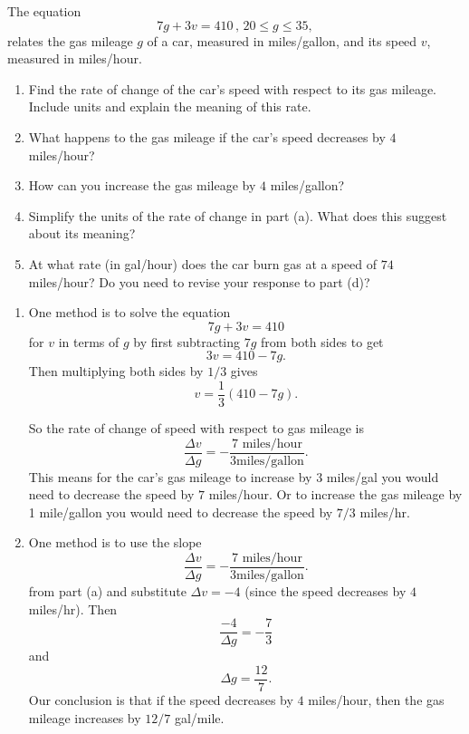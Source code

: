 \documentclass{ximera}
\begin{document}
\begin{question}  \label{Q43rtg4r54r32}
The equation
\[
    7g + 3v = 410 \, , \, 20\leq g \leq 35 ,
\]
relates the gas mileage $g$ of a car, measured in miles/gallon, and its speed $v$, measured in miles/hour.

\begin{enumerate}
\item{Find the rate of change of the car's speed with respect to its gas mileage. Include units and explain the meaning of this rate.}

\item{What happens to the gas mileage if the car's speed decreases by $4$ miles/hour?}

\item{How can you increase the gas mileage by $4$ miles/gallon?}

\item{Simplify the units of the rate of change in part (a). What does this suggest about its meaning?}

\item{At what rate (in gal/hour) does the car burn gas at a speed of $74$ miles/hour? Do you need to revise your response to part (d)?}
\end{enumerate}

\begin{explanation}
\begin{enumerate}
\item One method is to solve the equation 
\[
    7g + 3v = 410 
\]
for $v$ in terms of $g$ by first subtracting $7g$ from both sides to get
\[
    3v = 410 - 7g.
\]
Then multiplying both sides by $1/3$ gives 
\[ 
   v = \frac{1}{3}\left( 410  - 7g \right).
\]

So the rate of change of speed with respect to gas mileage is
\[
   \frac{\Delta v}{\Delta g} = -\frac{7\text{ miles/hour}}{3 \text{miles/gallon}}.
\]
This means for the car's gas mileage to increase by $3$ miles/gal you would need to decrease the speed by $7$ miles/hour. Or to increase the gas mileage by 1 mile/gallon you would need to decrease the speed by $7/3$ miles/hr.

\item One method is to use the slope 
\[
     \frac{\Delta v}{\Delta g} = -\frac{7\text{ miles/hour}}{3 \text{miles/gallon}}.
\]
from part (a) and substitute $\Delta v = -4$ (since the speed decreases by $4$ miles/hr). Then
\[
  \frac{-4}{\Delta g} = -\frac{7}{3}
\] 
and
\[
      \Delta g = \frac{12}{7}.
\]
Our conclusion is that if the speed decreases by $4$ miles/hour, then the gas mileage increases by $12/7$ gal/mile.


\end{enumerate}
\end{explanation}
\end{question}
\end{document}
